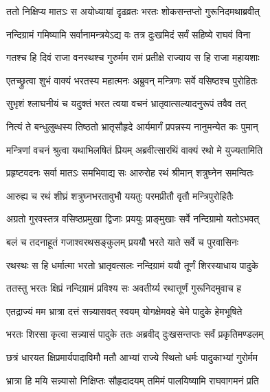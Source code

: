 
\twolineshloka
{ततो निक्षिप्य मातऽः स अयोध्यायां दृढव्रतः}
{भरतः शोकसन्तप्तो गुरूनिदमथाब्रवीत्} %

\twolineshloka
{नन्दिग्रामं गमिष्यामि सर्वानामन्त्रयेऽद्य वः}
{तत्र दुःखमिदं सर्वं सहिष्ये राघवं विना} %

\twolineshloka
{गतश्च हि दिवं राजा वनस्थश्च गुरुर्मम}
{रामं प्रतीक्षे राज्याय स हि राजा महायशाः} %

\twolineshloka
{एतच्छ्रुत्वा शुभं वाक्यं भरतस्य महात्मनः}
{अब्रुवन् मन्त्रिणः सर्वे वसिष्ठश्च पुरोहितः} %

\twolineshloka
{सुभृशं श्लाघनीयं च यदुक्तं भरत त्वया}
{वचनं भ्रातृवात्सल्यादनुरूपं तवैव तत्} %

\twolineshloka
{नित्यं ते बन्धुलुब्धस्य तिष्ठतो भ्रातृसौहृदे}
{आर्यमार्गं प्रपन्नस्य नानुमन्येत कः पुमान्} %

\twolineshloka
{मन्त्रिणां वचनं श्रुत्वा यथाभिलषितं प्रियम्}
{अब्रवीत्सारथिं वाक्यं रथो मे युज्यतामिति} %

\twolineshloka
{प्रहृष्टवदनः सर्वा मातऽः समभिवाद्य सः}
{आरुरोह रथं श्रीमान् शत्रुघ्नेन समन्वितः} %

\twolineshloka
{आरुह्य च रथं शीघ्रं शत्रुघ्नभरतावुभौ}
{ययतुः परमप्रीतौ वृतौ मन्त्रिपुरोहितैः} %

\twolineshloka
{अग्रतो गुरवस्तत्र वसिष्ठप्रमुखा द्विजाः}
{प्रययुः प्राङ्मुखाः सर्वे नन्दिग्रामो यतोऽभवत्} %

\twolineshloka
{बलं च तदनाहूतं गजाश्वरथसङ्कुलम्}
{प्रययौ भरते याते सर्वे च पुरवासिनः} %

\twolineshloka
{रथस्थः स हि धर्मात्मा भरतो भ्रातृवत्सलः}
{नन्दिग्रामं ययौ तूर्णं शिरस्याधाय पादुके} %

\twolineshloka
{ततस्तु भरतः क्षिप्रं नन्दिग्रामं प्रविश्य सः}
{अवतीर्य्य रथात्तूर्णं गुरूनिदमुवाच ह} %

\twolineshloka
{एतद्राज्यं मम भ्रात्रा दत्तं सन्न्यासवत् स्वयम्}
{योगक्षेमवहे चेमे पादुके हेमभूषिते} %

\twolineshloka
{भरतः शिरसा कृत्वा सन्न्यासं पादुके ततः}
{अब्रवीद् दुःखसन्तप्तः सर्वं प्रकृतिमण्डलम्} %

\twolineshloka
{छत्रं धारयत क्षिप्रमार्यपादाविमौ मतौ}
{आभ्यां राज्ये स्थितो धर्मः पादुकाभ्यां गुरोर्मम} %

\twolineshloka
{भ्रात्रा हि मयि सन्न्यासो निक्षिप्तः सौहृदादयम्}
{तमिमं पालयिष्यामि राघवागमनं प्रति} %

